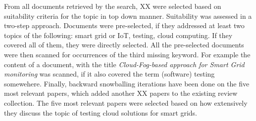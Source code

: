 From all documents retrieved by the search, XX were selected based on suitability criteria for the topic in top down manner. Suitability was assessed in a two-step approach. Documents were pre-selected, if they addressed at least two topics of the following: smart grid or IoT, testing, cloud computing. If they covered all of them, they were directly selected. All the pre-selected documents were then scanned for occurrences of the third missing keyword. For example the content of a document, with the title \textit{Cloud-Fog-based approach for Smart Grid monitoring} was scanned, if it also covered the term (software) testing somewehere. Finally, backward snowballing iterations have been done on the five most relevant papers, which added another XX papers to the existing review collection. The five most relevant papers were selected based on how extensively they discuss the topic of testing cloud solutions for smart grids.

